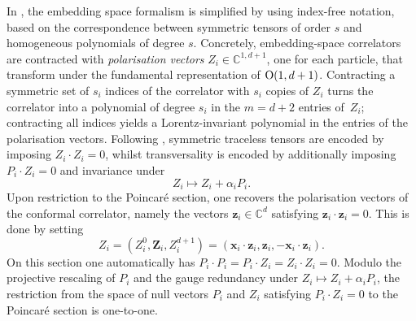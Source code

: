 \documentclass[12pt,a4paper]{extarticle}
\theoremstyle{definition}
\begin{document}
In \cite[p.~8–13]{CPPR}, the embedding space formalism is simplified by using index-free notation, based on the correspondence between symmetric tensors of order $s$ and homogeneous polynomials of degree $s$.
Concretely, embedding-space correlators are contracted with \textit{polarisation vectors} $Z_i\in\mathbb{C}^{1,d+1}$, one for each particle, that transform under the fundamental representation of ${\rm O}(1,d+1)$. Contracting a symmetric set of $s_i$ indices of the correlator with $s_i$ copies of $Z_i$ turns the correlator into  a polynomial of degree $s_i$ in the $m=d+2$ entries of~$Z_i$; contracting all indices yields a Lorentz-invariant polynomial in the entries of the polarisation vectors. Follo\-wing \cite{CPPR}, symmetric traceless tensors are encoded by imposing $Z_i\cdot Z_i=0$, whilst transversality is encoded by additionally imposing~$P_i\cdot Z_i=0$ and invariance under \[Z_i\mapsto Z_i+\alpha_iP_i.\]
Upon restriction to the Poincar\'e section, one recovers the polarisation
vectors of the conformal correlator, namely the vectors
$\mathbf{z}_i\in\mathbb{C}^d$ satisfying  $\mathbf{z}_i\cdot\mathbf{z}_i=0$. This is done by
setting
$$
Z_i=(Z_i^0,\mathbf{Z}_i,Z_i^{d+1})
=(\mathbf{x}_i\cdot\mathbf{z}_i,\mathbf{z}_i,-\mathbf{x}_i\cdot\mathbf{z}_i).
$$
On this section one automatically has
$
P_i\cdot P_i=P_i\cdot Z_i=Z_i\cdot Z_i=0
$.
Modulo the projective rescaling of $P_i$ and the gauge redundancy under 
$Z_i\mapsto Z_i+\alpha_iP_i$, the restriction from the space of null vectors $P_i$ and $Z_i$ satisfying $P_i\cdot Z_i=0$ to the Poincar\'e section is one-to-one.

\medskip
\end{document}
